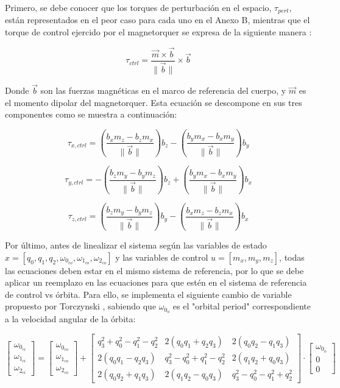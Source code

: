 Primero, se debe conocer que los torques de perturbación en el espacio, $\tau_{pert}$, están representados en el peor caso para cada uno en el Anexo B, mientras que el torque de control ejercido por el magnetorquer se expresa de la siguiente manera \cite{ref14}:

\begin{equation}
	\tau_{ctrl} = \frac{\vec{m} \times \vec{b}}{\|\vec{b}\|} \times \vec{b}
\end{equation}

Donde $\vec{b}$ son las fuerzas magnéticas en el marco de referencia del cuerpo, y $\vec{m}$ es el momento dipolar del magnetorquer. Esta ecuación se descompone en sus tres componentes como se muestra a continuación:

\[
	\tau_{x,ctrl} = \left( \frac{b_x m_z - b_z m_x}{\|\vec{b}\|} \right) b_z - \left( \frac{b_y m_x - b_x m_y}{\|\vec{b}\|} \right) b_y
\]

\[
	\tau_{y,ctrl} = -\left( \frac{b_z m_y - b_y m_z}{\|\vec{b}\|} \right) b_z + \left( \frac{b_y m_x - b_x m_y}{\|\vec{b}\|} \right) b_x
\]

\[
	\tau_{z,ctrl} = \left( \frac{b_z m_y - b_y m_z}{\|\vec{b}\|} \right) b_y - \left( \frac{b_x m_z - b_z m_x}{\|\vec{b}\|} \right) b_x
\]

Por último, antes de linealizar el sistema según las variables de estado $x = [q_0, q_1, q_2, \omega_{0_{co}}, \omega_{1_{co}}, \omega_{2_{co}}]$ y las variables de control $u = [m_x, m_y, m_z]$, todas las ecuaciones deben estar en el mismo sistema de referencia, por lo que se debe aplicar un reemplazo en las ecuaciones para que estén en el sistema de referencia de control vs órbita. Para ello, se implementa el siguiente cambio de variable propuesto por Torczynski \cite{ref14}, sabiendo que $\omega_{0_o}$ es el "orbital period" correspondiente a la velocidad angular de la órbita:

\[
\begin{bmatrix}
	\omega_{0_{ci}} \\
	\omega_{1_{ci}} \\
	\omega_{2_{ci}}
\end{bmatrix}
=
\begin{bmatrix}
	\omega_{0_{co}} \\
	\omega_{1_{co}} \\
	\omega_{2_{co}}
\end{bmatrix}
+
\begin{bmatrix}
	q_3^2 + q_0^2 - q_1^2 - q_2^2 & 2(q_0 q_1 + q_2 q_3) & 2(q_0 q_2 - q_1 q_3) \\
	2(q_0 q_1 - q_2 q_3) & q_3^2 - q_0^2 + q_1^2 - q_2^2 & 2(q_1 q_2 + q_0 q_3) \\
	2(q_0 q_2 + q_1 q_3) & 2(q_1 q_2 - q_0 q_3) & q_3^2 - q_0^2 - q_1^2 + q_2^2
\end{bmatrix}
\cdot
\begin{bmatrix}
	\omega_{0_o} \\
	0 \\
	0
\end{bmatrix}
\]

